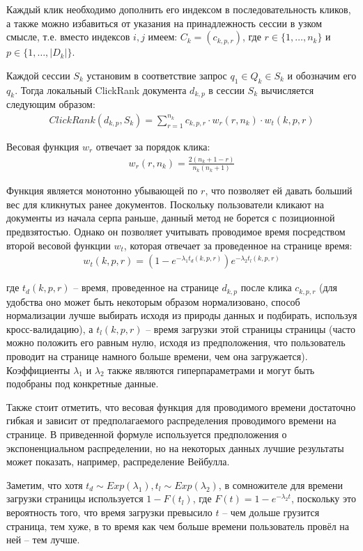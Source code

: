\documentclass[diploma]{nanolab2015}
\begin{document}
Каждый клик необходимо дополнить его индексом в последовательность кликов, а также можно избавиться от указания на принадлежность сессии в узком смысле, т.е. вместо индексов $i,j$ имеем: $C_k = (c_{k,p,r})$, где $r \in \{1, \dots, n_k\}$ и $p \in \{1, \dots, |D_k|\}$.

Каждой сессии $S_k$ установим в соответствие запрос $q_1 \in Q_k \in S_k$ и обозначим его $q_k$. Тогда локальный ClickRank \cite{clickrank} документа $d_{k,p}$ в сессии $S_k$ вычисляется следующим образом:
\begin{align}
    ClickRank(d_{k,p}, S_k) = \sum_{r=1}^{n_k} c_{k, p, r} \cdot w_r(r, n_k) \cdot w_t(k,p,r)
\end{align}

Весовая функция $w_r$ отвечает за порядок клика:
\begin{align}
    w_r(r, n_k) = \frac{2(n_k + 1 - r)}{n_k(n_k + 1)}
\end{align}

Функция является монотонно убывающей по $r$, что позволяет ей давать больший вес для кликнутых ранее документов. Поскольку пользователи кликают на документы из начала серпа раньше, данный метод не борется с позиционной предвзятостью. Однако он позволяет учитывать проводимое время посредством второй весовой функции $w_t$, которая отвечает за проведенное на странице время:
\begin{align}
    w_t(k,p,r) = (1 - e^{-\lambda_1 t_d(k,p,r)})e^{-\lambda_2 t_l(k,p,r)}
\end{align}

где $t_d(k,p,r)$ -- время, проведенное на странице $d_{k,p}$ после клика $c_{k,p,r}$ (для удобства оно может быть некоторым образом нормализовано, способ нормализации лучше выбирать исходя из природы данных и подбирать, используя кросс-валидацию), а $t_l(k,p,r)$ -- время загрузки этой страницы страницы (часто можно положить его равным нулю, исходя из предположения, что пользователь проводит на странице намного больше времени, чем она загружается). Коэффициенты $\lambda_1$ и $\lambda_2$ также являются гиперпараметрами и могут быть подобраны под конкретные данные.

Также стоит отметить, что весовая функция для проводимого времени достаточно гибкая и зависит от предполагаемого распределения проводимого времени на странице. В приведенной формуле используется предположения о экспоненциальном распределении, но на некоторых данных лучшие результаты может показать, например, распределение Вейбулла.

Заметим, что хотя $t_d \sim Exp(\lambda_1), t_l \sim Exp(\lambda_2)$, в сомножителе для времени загрузки страницы используется $1-F(t_l)$, где $F(t) = 1 - e^{-\lambda_2 t}$, поскольку это вероятность того, что время загрузки превысило $t$ -- чем дольше грузится страница, тем хуже, в то время как чем больше времени пользователь провёл на ней -- тем лучше.
\end{document}

